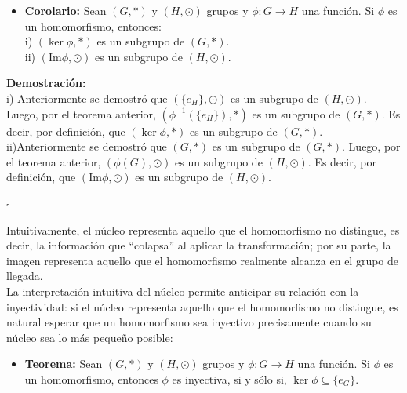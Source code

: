\documentclass[10 pt]{article}
\begin{document}
\begin{itemize}
    \item \Large{\textbf{Corolario:} Sean $(G,*)$ y $(H,\odot)$ grupos y $\phi:G \rightarrow H$ una función. Si $\phi$ es un homomorfismo, entonces: \\

    i) $(\ker \phi,*)$ es un subgrupo de $(G,*)$. \\

    ii) $(\text{Im} \phi,\odot)$ es un subgrupo de $(H,\odot)$.} \\
\end{itemize}

\Large{\textbf{Demostración:} \\

i) Anteriormente se demostró que $(\{e_H\},\odot)$ es un subgrupo de $(H,\odot)$. Luego, por el teorema anterior, $(\phi^{-1}(\{e_H\}),*)$ es un subgrupo de $(G,*)$. Es decir, por definición, que $(\ker \phi,*)$ es un subgrupo de $(G,*)$. \\

ii)Anteriormente se demostró que $(G,*)$ es un subgrupo de $(G,*)$. Luego, por el teorema anterior, $(\phi(G),\odot)$ es un subgrupo de $(H,\odot)$. Es decir, por definición, que $(\text{Im}\phi,\odot)$ es un subgrupo de $(H,\odot)$.} \\

\begin{flushright}
    $\square$
\end{flushright}

\Large{Intuitivamente, el núcleo representa aquello que el homomorfismo no distingue, es decir, la información que ``colapsa'' al aplicar la transformación; por su parte, la imagen representa aquello que el homomorfismo realmente alcanza en el grupo de llegada.} \\

\Large{La interpretación intuitiva del núcleo permite anticipar su relación con la inyectividad: si el núcleo representa aquello que el homomorfismo no distingue, es natural esperar que un homomorfismo sea inyectivo precisamente cuando su núcleo sea lo más pequeño posible:} \\

\begin{itemize}
    \item \Large{\textbf{Teorema:} Sean $(G,*)$ y $(H,\odot)$ grupos y $\phi:G \rightarrow H$ una función. Si $\phi$ es un homomorfismo, entonces $\phi$ es inyectiva, si y sólo si, $\ker \phi \subseteq \{e_G\}$.} \\
\end{itemize}
\end{document}
